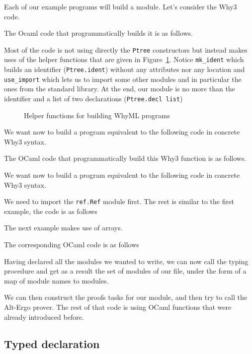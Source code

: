Each of our example programs will build a module.
Let's consider the Why3 code.

The Ocaml code that programmatically builds it is as follows.


Most of the code is not using directly the \verb|Ptree| constructors
but instead makes uses of the helper
functions that are given in Figure~\ref{fig:helpers}.
Notice \verb|mk_ident| which builds an identifier (\verb|Ptree.ident|) without
any attributes nor any location and \verb|use_import| which lets us to import
some other modules and in particular the ones from the standard library. At the end,
our module is no more than the identifier and a list of two declarations (\verb|Ptree.decl list|)
\begin{figure}[t]
  
  \caption{Helper functions for building WhyML programs}
  \label{fig:helpers}
\end{figure}


We want now to build a program equivalent to the following code in concrete Why3 syntax.


The OCaml code that programmatically build this Why3 function is as follows.


We want now to build a program equivalent to the following code in concrete Why3 syntax.

We need to import the \verb|ref.Ref| module first. The rest is similar to the first example, the code is as follows


The next example makes use of arrays.

The corresponding OCaml code is as follows


Having declared all the modules we wanted to write, we can now call the \why typing procedure
and get as a result the set of modules of our
file, under the form of a map of module names to modules.


We can then construct the proofs tasks for our module, and then try to
call the Alt-Ergo prover. The rest of that code is using OCaml
functions that were already introduced before.


\subsection{Typed declaration}


